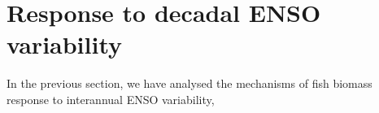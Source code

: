\section{Response to decadal ENSO variability}

In the previous section, we have analysed the mechanisms of fish biomass response to interannual ENSO variability, 
